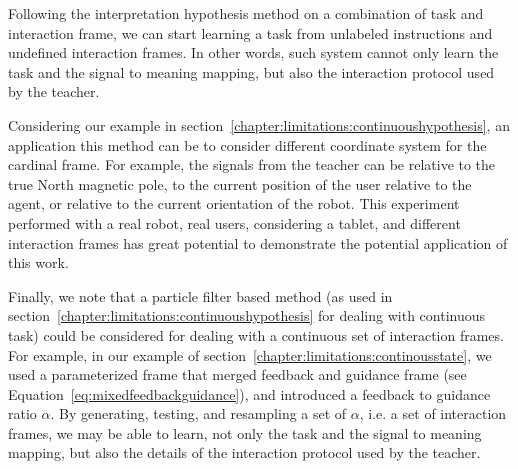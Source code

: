 Following the interpretation hypothesis method on a combination of task and interaction frame, we can start learning a task from unlabeled instructions and undefined interaction frames. In other words, such system cannot only learn the task and the signal to meaning mapping, but also the interaction protocol used by the teacher.

Considering our example in section~\ref{chapter:limitations:continuoushypothesis}, an application this method can be to consider different coordinate system for the cardinal frame. For example, the signals from the teacher can be relative to the true North magnetic pole, to the current position of the user relative to the agent, or relative to the current orientation of the robot. This experiment performed with a real robot, real users, considering a tablet, and different interaction frames has great potential to demonstrate the potential application of this work.

Finally, we note that a particle filter based method (as used in section~\ref{chapter:limitations:continuoushypothesis} for dealing with continuous task) could be considered for dealing with a continuous set of interaction frames. For example, in our example of section~\ref{chapter:limitations:continousstate}, we used a parameterized frame that merged feedback and guidance frame (see Equation~\ref{eq:mixedfeedbackguidance}), and introduced a feedback to guidance ratio $\alpha$. By generating, testing, and resampling a set of $\alpha$, i.e. a set of interaction frames, we may be able to learn, not only the task and the signal to meaning mapping, but also the details of the interaction protocol used by the teacher.

